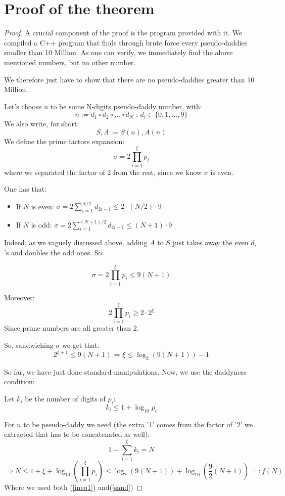 \documentclass[a4paper, 11pt]{report}
\begin{document}
\section{Proof of the theorem}
\begin{proof}
	A crucial component of the proof is the program provided with it. We compiled a C++ program that finds through brute force every pseudo-daddies smaller than 10 Million. As one can verify, we immediately find the above mentioned numbers, but no other number.
	
	We therefore just have to show that there are no pseudo-daddies greater than 10 Million.
	
	Let's choose $n$ to be some N-digits pseudo-daddy number, with:
	$$n:=d_1\circ d_2\circ\dots\circ d_N \text{ ; } d_i\in\{0,1,\dots,9\}$$
	We also write, for short:
	$$S,A:=S(n),A(n)$$
	We define the prime factors expansion:
	$$\sigma=2\prod_{i=1}^\xi p_i$$
	where we separated the factor of $2$ from the rest, since we know $\sigma$ is even.
	
	One has that:
	\begin{itemize}
		\item If $N$ is even: $\sigma=2\sum_{i=1}^{N/2}d_{2i-1}\leq2\cdot(N/2)\cdot9$
		\item If $N$ is odd: $\sigma=2\sum_{i=1}^{(N+1)/2}d_{2i-1}\leq(N+1)\cdot9$
	\end{itemize}
	
	Indeed, as we vaguely discussed above, adding $A$ to $S$ just takes away the even $d_i$'s and doubles the odd ones. So:
	
	\begin{equation}
		\sigma=2\prod_{i=1}^\xi p_i\leq9(N+1)
		\label{ineq1}
	\end{equation}
	
	Moreover:
	$$2\prod_{i=1}^\xi p_i\geq2\cdot2^{\xi}$$
	Since prime numbers are all greater than $2$.
	
	So, sandwiching $\sigma$ we get that:
	\begin{equation}
		2^{\xi+1}\leq9(N+1)\Rightarrow\xi\leq\log_2\left(9(N+1)\right)-1
		\label{sand}
	\end{equation}

	So far, we have just done standard manipulations. Now, we use the daddyness condition:	

	Let $k_i$ be the number of digits of $p_i$:
	$$k_i\leq1+\log_{10}p_i$$
	
	For $n$ to be pseudo-daddy we need (the extra '1' comes from the factor of '2' we extracted that has to be concatenated as well):
	$$1+\sum_{i=1}^{\xi}k_i=N$$
	\begin{equation}
		\Rightarrow N\leq1+\xi+\log_{10}(\prod_{i=1}^{\xi}p_i)\leq\log_2\left(9(N+1)\right)+\log_{10}(\frac{9}{2}\left(N+1\right))=:f(N)
		\label{final}
	\end{equation}
	Where we used both (\ref{ineq1}) and(\ref{sand})
	

\end{proof}
\end{document}
